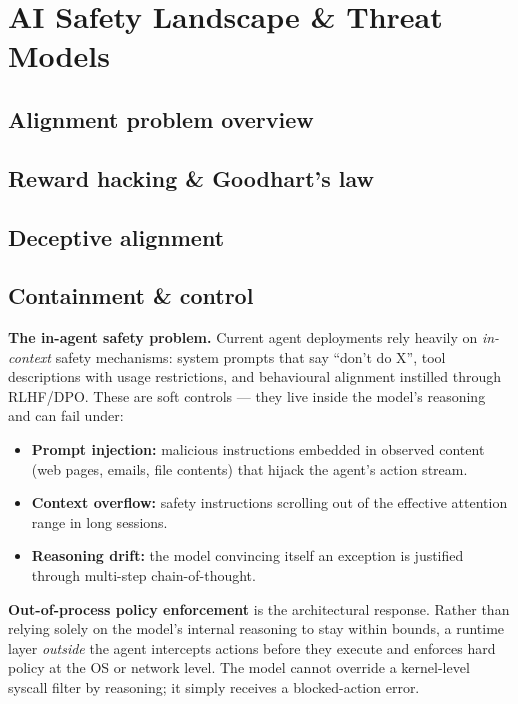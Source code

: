 
\section{AI Safety Landscape \& Threat Models}

\subsection{Alignment problem overview}


\subsection{Reward hacking \& Goodhart's law}


\subsection{Deceptive alignment}


\subsection{Containment \& control}

\textbf{The in-agent safety problem.} Current agent deployments rely heavily on
\emph{in-context} safety mechanisms: system prompts that say ``don't do X'',
tool descriptions with usage restrictions, and behavioural alignment instilled through
RLHF/DPO. These are soft controls --- they live inside the model's reasoning and can
fail under:
\begin{itemize}
  \item \textbf{Prompt injection:} malicious instructions embedded in observed content
    (web pages, emails, file contents) that hijack the agent's action stream.
  \item \textbf{Context overflow:} safety instructions scrolling out of the effective
    attention range in long sessions.
  \item \textbf{Reasoning drift:} the model convincing itself an exception is justified
    through multi-step chain-of-thought.
\end{itemize}

\textbf{Out-of-process policy enforcement} is the architectural response. Rather than
relying solely on the model's internal reasoning to stay within bounds, a runtime layer
\emph{outside} the agent intercepts actions before they execute and enforces hard
policy at the OS or network level. The model cannot override a kernel-level syscall
filter by reasoning; it simply receives a blocked-action error.

